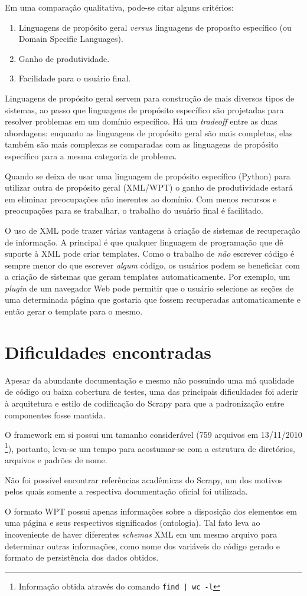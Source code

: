 Em uma comparação qualitativa, pode-se citar alguns critérios:

\begin{enumerate}
	\item Linguagens de propósito geral \emph{versus} linguagens de proposíto específico (ou Domain Specific Languages).
	\item Ganho de produtividade.
	\item Facilidade para o usuário final.
\end{enumerate}

Linguagens de propósito geral servem para construção de mais diversos tipos de sistemas, ao passo que linguagens de propósito específico são projetadas para resolver problemas em um domínio específico. Há um \emph{tradeoff} entre as duas abordagens: enquanto as linguagens de propósito geral são mais completas, elas também são mais complexas se comparadas com as linguagens de propósito específico para a mesma categoria de problema.

Quando se deixa de usar uma linguagem de propósito específico (Python) para utilizar outra de propósito geral (XML/WPT) o ganho de produtividade estará em eliminar preocupações não inerentes ao domínio. Com menos recursos e preocupações para se trabalhar, o trabalho do usuário final é facilitado.

O uso de XML pode trazer várias vantagens à criação de sistemas de recuperação de informação. A principal é que qualquer linguagem de programação que dê suporte à XML pode criar templates. Como o trabalho de \emph{não} escrever código é sempre menor do que escrever \emph{algum} código, os usuários podem se beneficiar com a criação de sistemas que geram templates automaticamente. Por exemplo, um \emph{plugin} de um navegador Web pode permitir que o usuário selecione as seções de uma determinada página que gostaria que fossem recuperadas automaticamente e então gerar o template para o mesmo.

\pagebreak
\section{Dificuldades encontradas}

Apesar da abundante documentação e mesmo não possuindo uma má qualidade de código ou baixa cobertura de testes, uma das principais dificuldades foi aderir à arquitetura e estilo de codificação do Scrapy para que a padronização entre componentes fosse mantida.

O framework em si possui um tamanho considerável (759 arquivos em 13/11/2010 \footnote{Informação obtida através do comando \texttt{find | wc -l} }), portanto, leva-se um tempo para acostumar-se com a estrutura de diretórios, arquivos e padrões de nome.

Não foi possível encontrar referências acadêmicas do Scrapy, um dos motivos pelos quais somente a respectiva documentação oficial foi utilizada.

O formato WPT possui apenas informações sobre a disposição dos elementos em uma página e seus respectivos significados (ontologia). Tal fato leva ao incoveniente de haver diferentes \emph{schemas} XML em um mesmo arquivo para determinar outras informações, como nome dos variáveis do código gerado e formato de persistência dos dados obtidos.